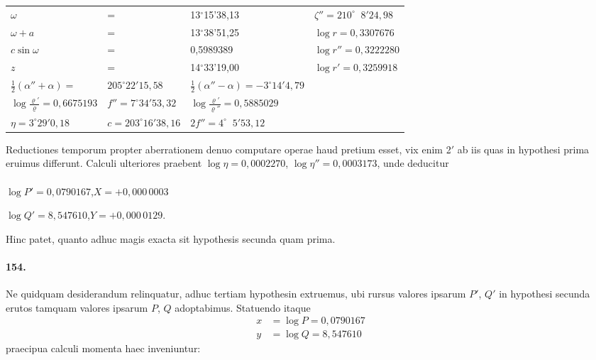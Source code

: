\documentclass[12pt,a4paper]{article}
\begin{document}
\begin{center}
\begin{tabular}{llll}
\toprule
$\omega$ &=& 13$^\circ$15'38,13 & $\zeta'' = 210^\circ\;\;8'24,98$\\
$\omega + a$ &=& 13$^\circ$38'51,25 & $\log r = 0,3307676$\\
$c\sin\omega$ &=& 0,5989389 & $\log r'' = 0,3222280$\\
$z$ &=& 14$^\circ$33'19,00 & $\log r' = 0,3259918$\\
$\tfrac{1}{2}(\alpha'' + \alpha) = $ & $205^\circ22'15,58$ & $\tfrac{1}{2}(\alpha'' - \alpha) = -3^\circ14'4,79$\\
$\log\tfrac{\varrho'}{\varrho} = 0,6675193$ & $f'' = 7^\circ34'53,32$ & $\log\tfrac{\varrho'}{\varrho''} = 0,5885029$\\
$\eta = 3^\circ29'0,18$ & $c = 203^\circ16'38,16$ & $2f'' = 4^\circ\;\;5'53,12$\\
\bottomrule
\end{tabular}
\end{center}

Reductiones temporum propter aberrationem denuo computare operae haud pretium esset, vix enim 2$'$ ab iis quas in hypothesi prima eruimus differunt. Calculi ulteriores praebent $\log\eta = 0,0002270$, $\log\eta'' = 0,0003173$, unde deducitur


\paragraph{}
$\log P' = 0,0790167$,\quad $X = +0,000\,0003$

$\log Q' = 8,547610$,\quad $Y = +0,000\,0129$.

Hinc patet, quanto adhuc magis exacta sit hypothesis secunda quam prima.

\paragraph{154.}
Ne quidquam desiderandum relinquatur, adhuc tertiam hypothesin extruemus, ubi rursus valores ipsarum $P'$, $Q'$ in hypothesi secunda erutos tamquam valores ipsarum $P$, $Q$ adoptabimus. Statuendo itaque
\begin{align*}
x &= \log P = 0,0790167\\
y &= \log Q = 8,547610
\end{align*}
praecipua calculi momenta haec inveniuntur:
\end{document}
